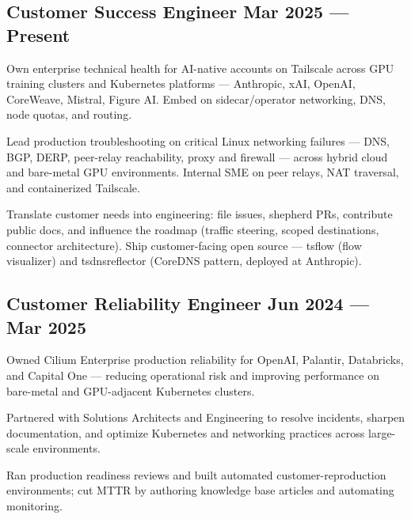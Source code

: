 \documentclass[letter,12pt]{article}
\begin{document}
\subsection{Customer Success Engineer \hfill Mar 2025 --- Present}
\begin{zitemize}
\item{Own enterprise technical health for AI-native accounts on Tailscale across GPU training clusters and Kubernetes platforms --- Anthropic, xAI, OpenAI, CoreWeave, Mistral, Figure AI. Embed on sidecar/operator networking, DNS, node quotas, and routing.}
\item{Lead production troubleshooting on critical Linux networking failures --- DNS, BGP, DERP, peer-relay reachability, proxy and firewall --- across hybrid cloud and bare-metal GPU environments. Internal SME on peer relays, NAT traversal, and containerized Tailscale.}
\item{Translate customer needs into engineering: file issues, shepherd PRs, contribute public docs, and influence the roadmap (traffic steering, scoped destinations, connector architecture). Ship customer-facing open source --- tsflow (flow visualizer) and tsdnsreflector (CoreDNS pattern, deployed at Anthropic).}
\end{zitemize}

\subsection{Customer Reliability Engineer \hfill Jun 2024 --- Mar 2025}
\begin{zitemize}
\item{Owned Cilium Enterprise production reliability for OpenAI, Palantir, Databricks, and Capital One --- reducing operational risk and improving performance on bare-metal and GPU-adjacent Kubernetes clusters.}
\item{Partnered with Solutions Architects and Engineering to resolve incidents, sharpen documentation, and optimize Kubernetes and networking practices across large-scale environments.}
\item{Ran production readiness reviews and built automated customer-reproduction environments; cut MTTR by authoring knowledge base articles and automating monitoring.}
\end{zitemize}
\end{document}
